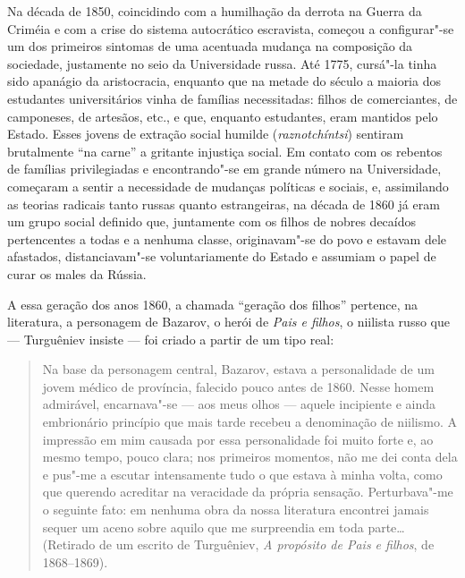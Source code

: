Na década de 1850, coincidindo com a humilhação da derrota na Guerra da Criméia e
com a crise do sistema autocrático escravista, começou a configurar"-se
um dos primeiros sintomas de uma acentuada mudança na composição da
sociedade, justamente no seio da Universidade russa. Até 1775, cursá"-la tinha
sido apanágio da aristocracia, enquanto que na metade do século  a
maioria dos estudantes universitários vinha de famílias necessitadas:
filhos de comerciantes, de camponeses, de artesãos, etc., e que,
enquanto estudantes, eram mantidos pelo Estado. Esses jovens de extração
social humilde (\emph{raznotchíntsi}) sentiram brutalmente ``na carne'' a
gritante injustiça social. Em contato com os rebentos de famílias
privilegiadas e encontrando"-se em grande número na Universidade,
começaram a sentir a necessidade de mudanças políticas e sociais, e,
assimilando as teorias radicais tanto russas quanto estrangeiras, na
década de 1860 já eram um grupo social definido que, juntamente com os
filhos de nobres decaídos pertencentes a todas e a nenhuma classe,
originavam"-se do povo e estavam dele afastados, distanciavam"-se
voluntariamente do Estado e assumiam o papel de curar os males da
Rússia.

A essa geração dos anos 1860, a chamada ``geração dos filhos'' pertence, na literatura, a personagem de Bazarov, o herói de \emph{Pais
e filhos}, o niilista russo que --- Turguêniev insiste --- foi criado a
partir de um tipo real:

\begin{quote}
Na base da personagem central, Bazarov, estava a personalidade de um
jovem médico de província, falecido pouco antes de 1860. Nesse homem
admirável, encarnava"-se --- aos meus olhos --- aquele incipiente e ainda
embrionário princípio que mais tarde recebeu a denominação de niilismo.
A impressão em mim causada por essa personalidade foi muito forte e, ao
mesmo tempo, pouco clara; nos primeiros momentos, não me dei conta dela
e pus"-me a escutar intensamente tudo o que estava à minha volta, como
que querendo acreditar na veracidade da própria sensação. Perturbava"-me
o seguinte fato: em nenhuma obra da nossa literatura encontrei jamais
sequer um aceno sobre aquilo que me surpreendia em toda parte\ldots{}
(Retirado de um escrito de Turguêniev, \emph{A propósito
de \emph{Pais e filhos}}, de 1868--1869).
\end{quote}

